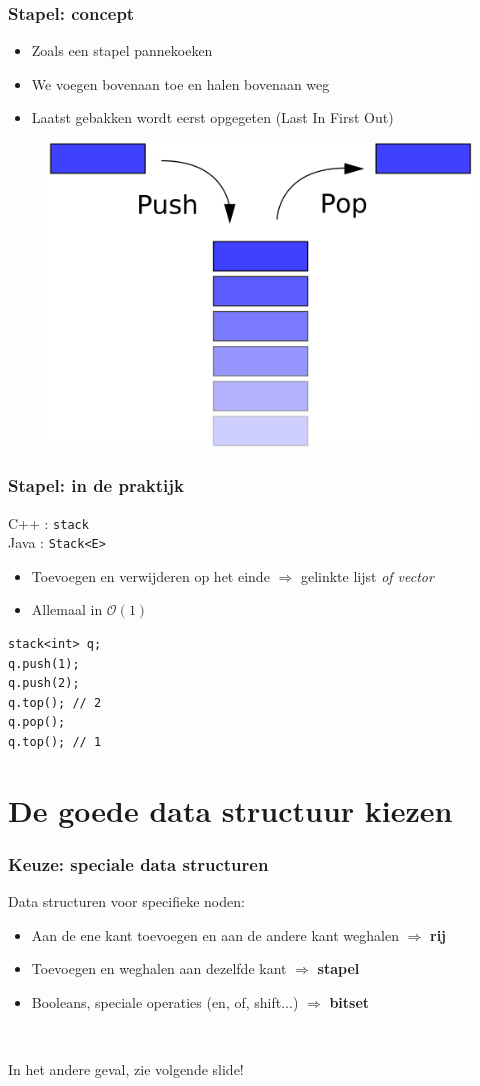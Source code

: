 \documentclass[12pt]{beamer}
\newcommand{\bigoh}[1]{\mathcal{O}\left(#1\right)}
\newcommand{\constant}{\bigoh{1}}
\begin{document}
\begin{frame}
\frametitle{Stapel: concept}
\begin{itemize}
\item Zoals een stapel pannekoeken
\item We voegen bovenaan toe en halen bovenaan weg
\item Laatst gebakken wordt eerst opgegeten (Last In First Out)
\end{itemize}
\begin{figure}
\centering
\includegraphics[width=.5\textwidth]{img/stack}
\end{figure}
\end{frame}

\begin{frame}[fragile]
\frametitle{Stapel: in de praktijk}
C++ : \texttt{stack} \\
Java : \texttt{Stack<E>}
\begin{itemize}
\item Toevoegen en verwijderen op het einde $\Rightarrow$ gelinkte lijst \emph{of vector}
\item Allemaal in $\constant$
\end{itemize}
\begin{lstlisting}
stack<int> q;
q.push(1);
q.push(2);
q.top(); // 2
q.pop();
q.top(); // 1
\end{lstlisting}
\end{frame}

\section{De goede data structuur kiezen}

\begin{frame}
\frametitle{Keuze: speciale data structuren}
Data structuren voor specifieke noden:
\begin{itemize}
\item Aan de ene kant toevoegen en aan de andere kant weghalen $\Rightarrow$ \textbf{rij}
\item Toevoegen en weghalen aan dezelfde kant $\Rightarrow$ \textbf{stapel}
\item Booleans, speciale operaties (en, of, shift...)  $\Rightarrow$ \textbf{bitset}
\end{itemize}

~

In het andere geval, zie volgende slide!
\end{frame}
\end{document}
